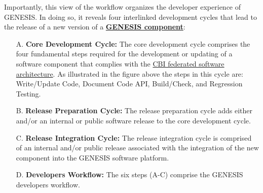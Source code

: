 \documentclass[12pt]{article}
\begin{document}
Importantly, this view of the workflow organizes the developer experience of GENESIS. In doing so, it reveals four interlinked development cycles that lead to the release of a new version of a \href{../reserved-words/reserved-words.tex}{\bf GENESIS component}:
\begin{itemize}
   \item[A.]{\bf Core Development Cycle:} The core development cycle comprises the four fundamental steps required for the development or updating of a software component that complies with the \href{../genesis-overview/genesis-overview.tex}{CBI federated software architecture}. As illustrated in the figure above the steps in this cycle are: Write/Update Code, Document Code API, Build/Check, and Regression Testing.
   \item[B.]{\bf Release Preparation Cycle:} The release preparation cycle adds either and/or an internal or public software release to the core development cycle.
   \item[C.]{\bf Release Integration Cycle:} The release integration cycle is comprised of an internal and/or public release associated with the integration of the new component into the GENESIS software platform.
   \item[D.]{\bf Developers Workflow:} The six steps (A-C) comprise the GENESIS developers workflow.
\end{itemize}
\end{document}
